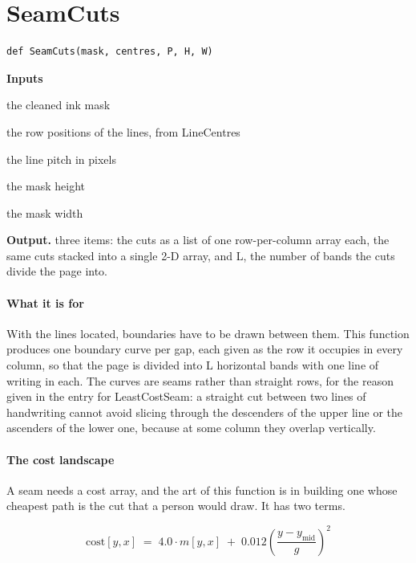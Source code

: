 \section{SeamCuts}
\begin{lstlisting}[style=sig]
def SeamCuts(mask, centres, P, H, W)
\end{lstlisting}

\noindent\textbf{Inputs}
\begin{description}[leftmargin=2.2em,style=nextline,font=\normalfont\ttfamily]\setlength\itemsep{1pt}
  \item[{mask}] \normalfont the cleaned ink mask
  \item[{centres}] \normalfont the row positions of the lines, from LineCentres
  \item[{P}] \normalfont the line pitch in pixels
  \item[{H}] \normalfont the mask height
  \item[{W}] \normalfont the mask width
\end{description}

\noindent\textbf{Output.} three items: the cuts as a list of one row-per-column array each, the same cuts stacked into a single 2-D array, and L, the number of bands the cuts divide the page into.


\paragraph{What it is for}
With the lines located, boundaries have to be drawn between them. This function produces one boundary curve per gap, each given as the row it occupies in every column, so that the page is divided into L horizontal bands with one line of writing in each. The curves are seams rather than straight rows, for the reason given in the entry for LeastCostSeam: a straight cut between two lines of handwriting cannot avoid slicing through the descenders of the upper line or the ascenders of the lower one, because at some column they overlap vertically.


\paragraph{The cost landscape}
A seam needs a cost array, and the art of this function is in building one whose cheapest path is the cut that a person would draw. It has two terms.


\begin{equation}
\mathrm{cost}[y,x] \;=\; 4.0 \cdot m[y,x] \;+\; 0.012 \left(\frac{y - y_{\mathrm{mid}}}{g}\right)^{\!2}
\end{equation}

